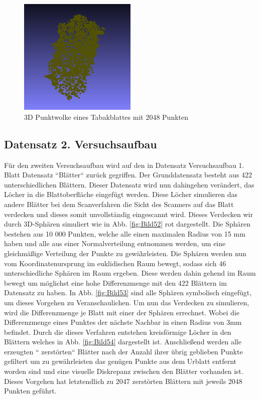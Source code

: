 \documentclass{llncs}
\begin{document}
\begin{figure}[htbp] 
	\centering
	\includegraphics[width=0.5\textwidth]{leaf1.png}
	\caption{3D Punktwolke eines Tabakblattes mit 2048 Punkten}
	\label{fig:Bild51}
\end{figure}
\newpage
\subsection{Datensatz 2. Versuchsaufbau}\label{sec:versuch2_daten}

Für den zweiten Versuchsaufbau wird auf den in Datensatz Versuchsaufbau 1. Blatt Datensatz ``Blätter`` zurück gegriffen. Der Grunddatensatz besteht aus 422 unterschiedlichen Blättern. Dieser Datensatz wird nun dahingehen verändert, das Löcher in die Blattoberfläche eingefügt werden. Diese Löcher simulieren das andere Blätter bei dem Scanverfahren die Sicht des Scanners auf das Blatt verdecken und dieses somit unvollständig eingescannt wird. Dieses Verdecken wir durch 3D-Sphären simuliert wie in Abb. \ref{fig:Bild52}  rot dargestellt. Die Sphären bestehen aus 10 000 Punkten, welche alle einen maximalen Radius von 15 mm haben und alle aus einer Normalverteilung entnommen werden, um  eine gleichmäßige Verteilung der Punkte zu gewährleisten. Die Sphären werden nun vom Koordinatenursprung im euklidischen Raum bewegt, sodass sich 46 unterschiedliche Sphären im Raum ergeben. Diese werden dahin gehend im Raum bewegt um möglichst eine hohe Differenzmenge mit den 422 Blättern im Datensatz zu haben. In Abb. \ref{fig:Bild53} sind alle Sphären symbolisch eingefügt, um dieses Vorgehen zu Veranschaulichen. Um nun das Verdecken zu simulieren, wird die Differenzmenge je Blatt mit einer der Sphären errechnet. Wobei die Differenzmenge eines Punktes der nächste Nachbar in einen Radius von 3mm befindet. Durch die dieses Verfahren entstehen kreisförmige Löcher in den Blättern welches in Abb. \ref{fig:Bild54} dargestellt ist. Anschließend werden alle erzeugten `` zerstörten`` Blätter nach der Anzahl ihrer übrig geblieben Punkte gefiltert um zu gewährleisten das genügen Punkte aus dem Urblatt entfernt worden sind und eine visuelle Diskrepanz zwischen den Blätter vorhanden ist. Dieses Vorgehen hat letztendlich zu 2047 zerstörten Blättern mit jeweils 2048 Punkten geführt.
\end{document}

